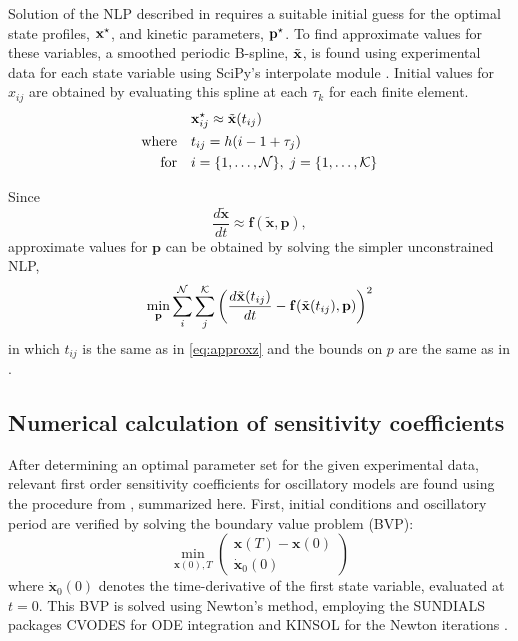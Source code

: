 Solution of the NLP described in  requires a suitable initial guess for the optimal state profiles, ${\mathbf{x}}^\star$, and kinetic parameters, ${\mathbf{p}}^\star$. 
To find approximate values for these variables, a smoothed periodic B-spline, $\tilde{\mathbf{x}}$, is found using experimental data for each state variable using SciPy's interpolate module \cite{Jones}. 
Initial values for $x_{ij}$ are obtained by evaluating this spline at each $\tau_k$ for each finite element.
\begin{equation} \label{eq:approxz}
  \begin{aligned} &{\mathbf{x}}^\star_{ij} \approx \tilde{\mathbf{x}}(t_{ij}) \\ 
    \textrm{where} \quad & t_{ij} = h(i - 1 + \tau_j) \\
    \textrm{for} \quad & i = \{1,\ldots,{\cal N}\},\; j = \{1,\ldots,{\cal K}\}
  \end{aligned}
\end{equation}

Since
\begin{equation}
  \frac{d\tilde{\bm x}}{dt} \approx {\bm f}(\tilde{\bm x},{\bm p}),
\end{equation}
approximate values for $\bm p$ can be obtained by solving the simpler unconstrained NLP,
\begin{equation}
  \min_{\mathbf{p}} \sum_i^{{\cal N}}\sum_j^{{\cal K}}\left(\frac{d\tilde{\mathbf{x}}(t_{ij})}{dt} - {\mathbf{f}}(\tilde{\mathbf{x}}(t_{ij}),{\mathbf{p}})\right)^2
\end{equation}
in which $t_{ij}$ is the same as in \ref{eq:approxz} and the bounds on $p$ are the same as in .

\subsection{Numerical calculation of sensitivity coefficients}

After determining an optimal parameter set for the given experimental data, relevant first order sensitivity coefficients for oscillatory models are found using the procedure from \cite{Wilkins2009}, summarized here. 
First, initial conditions and oscillatory period are verified by solving the boundary value problem (BVP):
\begin{equation} \label{eq:bvp}
  \min_{{\bm x}(0),T} \left(\begin{array}{c} {\bm x}(T) - {\bm x}(0) \\ \dot{{\bm x}}_0(0)
  \end{array}\right)     
\end{equation}
where $\dot{{\bm x}}_0(0)$ denotes the time-derivative of the first state variable, evaluated at $t=0$. 
This BVP is solved using Newton's method, employing the SUNDIALS packages CVODES for ODE integration and KINSOL for the Newton iterations \cite{Hindmarsh2005}.
 
